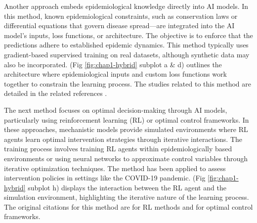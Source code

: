 Another approach embeds epidemiological knowledge directly into AI models. In this method, known epidemiological constraints, such as conservation laws or differential equations that govern disease spread—are integrated into the AI model’s inputs, loss functions, or architecture. The objective is to enforce that the predictions adhere to established epidemic dynamics. This method typically uses gradient-based supervised training on real datasets, although synthetic data may also be incorporated. (Fig \ref{fig:chap1-hybrid} subplot a \& d) outlines the architecture where epidemiological inputs and custom loss functions work together to constrain the learning process. The studies related to this method are detailed in the related references \cite{kharazmi_identifiability_2021,barmparis_physicsinformed_2022,de_rosa_modelling_2023,torku_seinn_2023,berkhahn_physics-informed_2022,rodriguez_einns_2023,shaier_data-driven_2022,bertaglia_asymptotic-preserving_2022,malinzi_determining_2022}.

The next method focuses on optimal decision-making through AI models, particularly using reinforcement learning (RL) or optimal control frameworks. In these approaches, mechanistic models provide simulated environments where RL agents learn optimal intervention strategies through iterative interactions. The training process involves training RL agents within epidemiologically based environments or using neural networks to approximate control variables through iterative optimization techniques. The method has been applied to assess intervention policies in settings like the COVID-19 pandemic. (Fig \ref{fig:chap1-hybrid} subplot h) displays the interaction between the RL agent and the simulation environment, highlighting the iterative nature of the learning process. The original citations for this method are \cite{yao_optimal_2023,zou_data-efficient_2021,vereshchaka_optimization_2021,song_reinforced_2020,probert_context_2019,ohi_exploring_2020,khadilkar_optimising_2020,hao_reinforcement_2022,libin_deep_2021,awasthi_vacsim_2022,song_robust_2023,padmanabhan_reinforcement_2021,kompella_reinforcement_2020,mai_planning_2023,asikis_neural_2022,roy_knowledge_2021,colas_epidemioptim_2021,capobianco_agent-based_2021,ou_active_2021,trad_towards_2022,bushaj_simulation-deep_2022,chadi_2022 ,guo_pacar_2022,kulkarni_optimizing_2022,deng_optimal_2021,hwang_optimal_2022,wan_multi-objective_2022,miralles-pechuan_methodology_2020,bampa_epidrlearn_2022,shami_economic_2022,du_district-coupled_2022,benalcazar_deep_2021,xia_controlling_2022,khatami_reinforcement_2021,zong_reinforcement_2022,du_hrl4ec_2023,nguyen_general_2022,beigi_application_2021} for RL methods and \cite{yin_optimal_2023,asikis_neural_2022,courtes_reduced_2024,li_robust_2021,kmet_neural_2023,kmet_bezier_2019} for optimal control frameworks.

